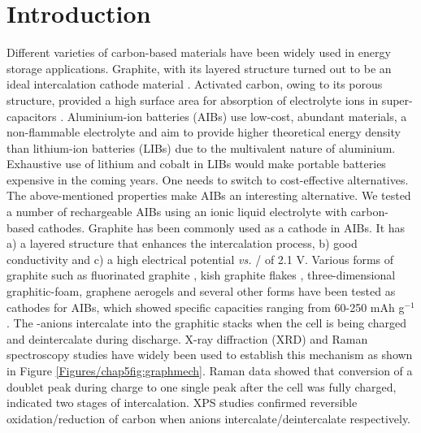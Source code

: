 \section{Introduction}
Different varieties of carbon-based materials have been widely used in energy storage applications. Graphite, with its layered structure turned out to be an ideal intercalation cathode material \cite{ji_recent_2011, yoo_large_2008, lian_large_2010}. Activated carbon, owing to its porous structure, provided a high surface area for absorption of electrolyte ions in super-capacitors \cite{eliad_ion_2001, zhu_carbon-based_2011-2}. Aluminium-ion batteries (AIBs) use low-cost, abundant materials, a non-flammable electrolyte and aim to provide higher theoretical energy density than lithium-ion batteries (LIBs) due to the multivalent nature of aluminium. Exhaustive use of lithium and cobalt in LIBs would make portable batteries expensive in the coming years. One needs to switch to cost-effective alternatives. The above-mentioned properties make AIBs an interesting alternative\cite{ambroz_trends_2017-1}. We tested a number of rechargeable AIBs using an ionic liquid electrolyte with carbon-based cathodes.
Graphite has been commonly used as a cathode in AIBs. It has a) a layered structure that enhances the intercalation process, b) good conductivity and c) a high electrical potential {\it vs.} / of 2.1 V. Various forms of graphite such as fluorinated graphite \cite{rani_fluorinated_2013}, kish graphite flakes \cite{wang_kish_2017-1}, three-dimensional graphitic-foam\cite{wu_3d_2016}, graphene aerogels\cite{huang_graphene_2019} and several other forms have been tested as cathodes for AIBs, which showed specific capacities ranging from 60-250 mAh g$^{-1}$. The -anions intercalate into the graphitic stacks when the cell is being charged and deintercalate during discharge. X-ray diffraction (XRD) and Raman spectroscopy studies have widely been used to establish this mechanism\cite{rani_fluorinated_2013, wang_advanced_2017, lin_ultrafast_2015-3} as shown in Figure \ref{Figures/chap5fig:graphmech}. Raman data showed that conversion of a doublet peak during charge to one single peak after the cell was fully charged, indicated two stages of intercalation. XPS studies confirmed reversible oxidation/reduction of carbon when  anions intercalate/deintercalate respectively\cite{stadie_zeolite-templated_2017, liu_binder-free_2019}.
